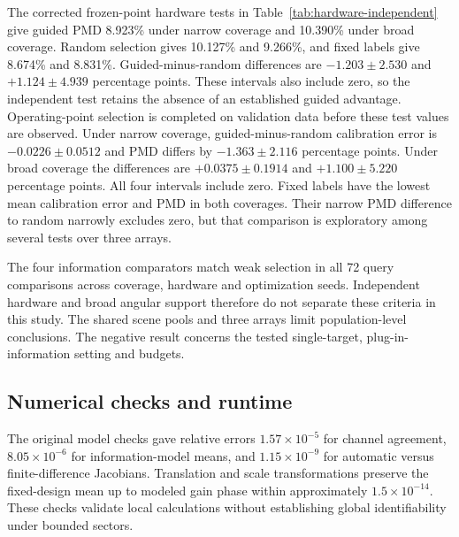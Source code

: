 \documentclass[conference]{IEEEtran}
\begin{document}
The corrected frozen-point hardware tests in Table~\ref{tab:hardware-independent} give guided PMD 8.923\% under narrow coverage and 10.390\% under broad coverage. Random selection gives 10.127\% and 9.266\%, and fixed labels give 8.674\% and 8.831\%. Guided-minus-random differences are $-1.203\pm2.530$ and $+1.124\pm4.939$ percentage points. These intervals also include zero, so the independent test retains the absence of an established guided advantage. Operating-point selection is completed on validation data before these test values are observed.
Under narrow coverage, guided-minus-random calibration error is $-0.0226\pm0.0512$ and PMD differs by $-1.363\pm2.116$ percentage points. Under broad coverage the differences are $+0.0375\pm0.1914$ and $+1.100\pm5.220$ percentage points. All four intervals include zero. Fixed labels have the lowest mean calibration error and PMD in both coverages. Their narrow PMD difference to random narrowly excludes zero, but that comparison is exploratory among several tests over three arrays.

The four information comparators match weak selection in all 72 query comparisons across coverage, hardware and optimization seeds. Independent hardware and broad angular support therefore do not separate these criteria in this study. The shared scene pools and three arrays limit population-level conclusions. The negative result concerns the tested single-target, plug-in-information setting and budgets.

\subsection{Numerical checks and runtime}
The original model checks gave relative errors $1.57\times10^{-5}$ for channel agreement, $8.05\times10^{-6}$ for information-model means, and $1.15\times10^{-9}$ for automatic versus finite-difference Jacobians. Translation and scale transformations preserve the fixed-design mean up to modeled gain phase within approximately $1.5\times10^{-14}$. These checks validate local calculations without establishing global identifiability under bounded sectors.
\end{document}
